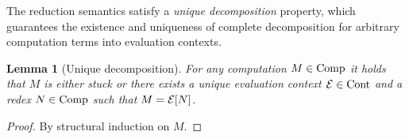 \documentclass[12pt,phd,lfcs,twoside,openright,logo,leftchapter,normalheadings]{infthesis}
\theoremstyle{plain}
\newtheorem{lemma}[theorem]{Lemma}
\theoremstyle{definition}
\begin{document}
%

The reduction semantics satisfy a \emph{unique decomposition}
property, which guarantees the existence and uniqueness of complete
decomposition for arbitrary computation terms into evaluation
contexts.
%
\begin{lemma}[Unique decomposition]\label{lem:base-language-uniq-decomp}
  For any computation $M \in \textrm{Comp}$ it holds that $M$ is either
  stuck or there exists a unique evaluation context $\mathcal{E} \in \textrm{Cont}$
  and a redex $N \in \textrm{Comp}$ such that $M = \mathcal{E}[N]$.
\end{lemma}
%
\begin{proof}
  By structural induction on $M$.
\end{proof}
\end{document}
